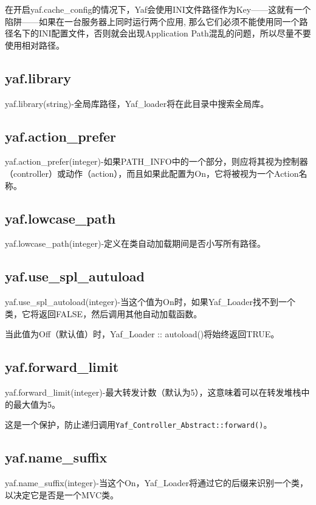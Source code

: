 在开启yaf.cache\_config的情况下，Yaf会使用INI文件路径作为Key——这就有一个陷阱——如果在一台服务器上同时运行两个应用, 那么它们必须不能使用同一个路径名下的INI配置文件，否则就会出现Application Path混乱的问题，所以尽量不要使用相对路径。


\subsection{yaf.library}

yaf.library(string)-全局库路径，Yaf\_loader将在此目录中搜索全局库。

\subsection{yaf.action\_prefer}


yaf.action\_prefer(integer)-如果PATH\_INFO中的一个部分，则应将其视为控制器（controller）或动作（action），而且如果此配置为On，它将被视为一个Action名称。

\subsection{yaf.lowcase\_path}

yaf.lowcase\_path(integer)-定义在类自动加载期间是否小写所有路径。

\subsection{yaf.use\_spl\_autuload}

yaf.use\_spl\_autoload(integer)-当这个值为On时，如果Yaf\_Loader找不到一个类，它将返回FALSE，然后调用其他自动加载函数。

当此值为Off（默认值）时，Yaf\_Loader :: autoload()将始终返回TRUE。

\subsection{yaf.forward\_limit}

yaf.forward\_limit(integer)-最大转发计数（默认为5），这意味着可以在转发堆栈中的最大值为5。

这是一个保护，防止递归调用\texttt{Yaf\_Controller\_Abstract::forward()}。

\subsection{yaf.name\_suffix}

yaf.name\_suffix(integer)-当这个On，Yaf\_Loader将通过它的后缀来识别一个类，以决定它是否是一个MVC类。

